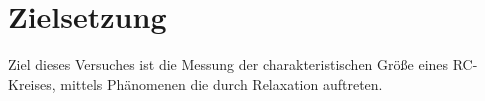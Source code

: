 \section{Zielsetzung}
\label{sec:Ziel}
Ziel dieses Versuches ist die Messung der charakteristischen Größe eines
RC-Kreises, mittels Phänomenen die durch Relaxation auftreten.
